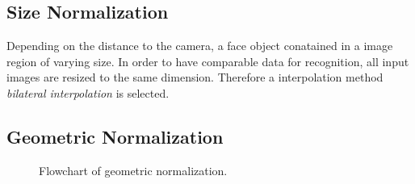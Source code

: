 \subsection{Size Normalization}
Depending on the distance to the camera, a face object conatained in a image region of varying size.
In order to have comparable data for recognition, all input images are resized to the same dimension.
Therefore a interpolation method \textit{bilateral interpolation} is selected.

\subsection{Geometric Normalization}

\begin{figure}
\centering
{}
\caption{Flowchart of geometric normalization.}
\label{fc:GeomNorm}
\end{figure}

